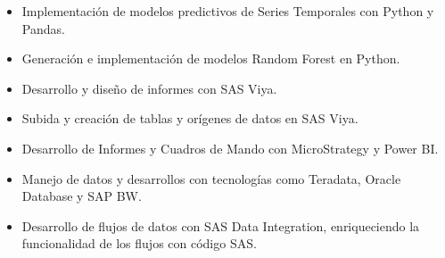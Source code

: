 \documentclass[10pt,a4paper,ragged2e]{altacv}
\begin{document}

\begin{fullwidth}
\makecvheader
\end{fullwidth}



\begin{itemize}
\item Implementación de modelos predictivos de Series Temporales con Python y Pandas.
\item Generación e implementación de modelos Random Forest en Python.
\item Desarrollo y diseño de informes con SAS Viya.
\item Subida y creación de tablas y orígenes de datos en SAS Viya.
\item Desarrollo de Informes y Cuadros de Mando con MicroStrategy y Power BI.
\item Manejo de datos y desarrollos con tecnologías como Teradata, Oracle Database y SAP BW.
\item Desarrollo de flujos de datos con SAS Data Integration, enriqueciendo la funcionalidad de los flujos con código SAS.
\end{itemize}
\end{document}
